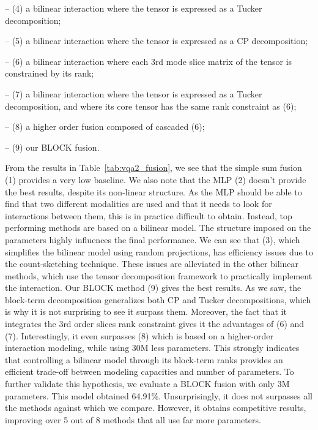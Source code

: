 \documentclass[letterpaper]{article} \usepackage{aaai19}  \usepackage{times}  \usepackage{helvet}  \usepackage{courier}  \usepackage{url}  \usepackage{graphicx}  \usepackage{booktabs}       \usepackage{comment}
\begin{document}
-- (4) a bilinear interaction where the tensor is expressed as a Tucker decomposition;

-- (5) a bilinear interaction where the tensor is expressed as a CP decomposition;

-- (6) a bilinear interaction where each 3rd mode slice matrix of the tensor is constrained by its rank;

-- (7) a bilinear interaction where the tensor is expressed as a Tucker decomposition, and where its core tensor has the same rank constraint as (6);

-- (8) a higher order fusion composed of cascaded (6);

-- (9) our BLOCK fusion.

From the results in Table~\ref{tab:vqa2_fusion}, we see that the simple sum fusion (1) provides a very low baseline. We also note that the MLP (2) doesn't provide the best results, despite its non-linear structure. As the MLP should be able to find that two different modalities are used and that it needs to look for interactions between them, this is in practice difficult to obtain. Instead, top performing methods are based on a bilinear model. The structure imposed on the parameters highly influences the final performance. We can see that (3), which simplifies the bilinear model using random projections, has efficiency issues due to the count-sketching technique. These issues are alleviated in the other bilinear methods, which use the tensor decomposition framework to practically implement the interaction. Our BLOCK method (9) gives the best results. As we saw, the block-term decomposition generalizes both CP and Tucker decompositions, which is why it is not surprising to see it surpass them. Moreover, the fact that it integrates the 3rd order slices rank constraint gives it the advantages of (6) and (7). Interestingly, it even surpasses (8) which is based on a higher-order interaction modeling, while using 30M less parameters. This strongly indicates that controlling a bilinear model through its block-term ranks provides an efficient trade-off between modeling capacities and number of parameters. To further validate this hypothesis, we evaluate a BLOCK fusion with only 3M parameters. This model obtained 64.91\%. Unsurprisingly, it does not surpasses all the methods against which we compare. However, it obtains competitive results, improving over 5 out of 8 methods that all use far more parameters. 
\end{document}
